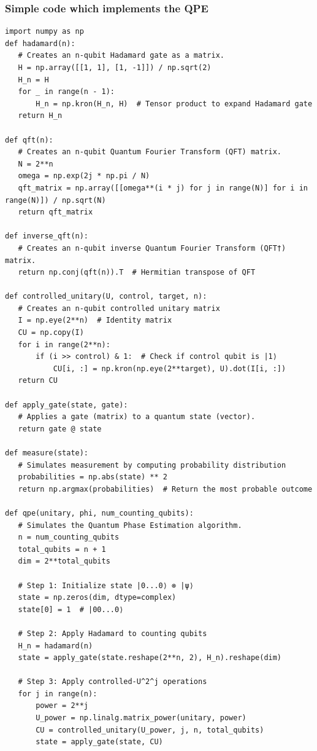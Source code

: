 \documentclass{beamer}
\begin{document}
\begin{frame}
\frametitle{Simple code which implements the QPE}

\begin{Verbatim}[numbers=none,fontsize=\fontsize{9pt}{9pt},baselinestretch=0.95]
import numpy as np
def hadamard(n):
   # Creates an n-qubit Hadamard gate as a matrix.
   H = np.array([[1, 1], [1, -1]]) / np.sqrt(2)
   H_n = H
   for _ in range(n - 1):
       H_n = np.kron(H_n, H)  # Tensor product to expand Hadamard gate
   return H_n

def qft(n):
   # Creates an n-qubit Quantum Fourier Transform (QFT) matrix.
   N = 2**n
   omega = np.exp(2j * np.pi / N)
   qft_matrix = np.array([[omega**(i * j) for j in range(N)] for i in range(N)]) / np.sqrt(N)
   return qft_matrix

def inverse_qft(n):
   # Creates an n-qubit inverse Quantum Fourier Transform (QFT†) matrix.
   return np.conj(qft(n)).T  # Hermitian transpose of QFT

def controlled_unitary(U, control, target, n):
   # Creates an n-qubit controlled unitary matrix
   I = np.eye(2**n)  # Identity matrix
   CU = np.copy(I)
   for i in range(2**n):
       if (i >> control) & 1:  # Check if control qubit is |1⟩
           CU[i, :] = np.kron(np.eye(2**target), U).dot(I[i, :])
   return CU

def apply_gate(state, gate):
   # Applies a gate (matrix) to a quantum state (vector).
   return gate @ state

def measure(state):
   # Simulates measurement by computing probability distribution
   probabilities = np.abs(state) ** 2
   return np.argmax(probabilities)  # Return the most probable outcome

def qpe(unitary, phi, num_counting_qubits):
   # Simulates the Quantum Phase Estimation algorithm.
   n = num_counting_qubits
   total_qubits = n + 1
   dim = 2**total_qubits

   # Step 1: Initialize state |0...0⟩ ⊗ |ψ⟩
   state = np.zeros(dim, dtype=complex)
   state[0] = 1  # |00...0⟩

   # Step 2: Apply Hadamard to counting qubits
   H_n = hadamard(n)
   state = apply_gate(state.reshape(2**n, 2), H_n).reshape(dim)

   # Step 3: Apply controlled-U^2^j operations
   for j in range(n):
       power = 2**j
       U_power = np.linalg.matrix_power(unitary, power)
       CU = controlled_unitary(U_power, j, n, total_qubits)
       state = apply_gate(state, CU)


\end{Verbatim}
\end{frame}
\end{document}
